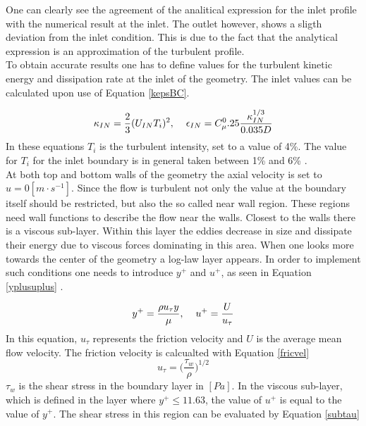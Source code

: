 \documentclass{CFD2017}
\begin{document}

One can clearly see the agreement of the analitical expression for the inlet profile with the numerical result at the inlet. The outlet however, shows a sligth deviation from the inlet condition. This is due to the fact that the analytical expression is an approximation of the turbulent profile.\\
To obtain accurate results one has to define values for the turbulent kinetic energy and dissipation rate at the inlet of the geometry. The inlet values can be calculated upon use of Equation \ref{kepsBC}.

\begin{equation}
\label{kepsBC}
\kappa_{IN}=\frac{2}{3}(U_{IN}T_i)^2,\hspace{4mm}\epsilon_{IN}=C_{\mu}^0.25\frac{\kappa_{IN}^{1/3}}{0.035 D}
\end{equation}
In these equations $T_i$ is the turbulent intensity, set to a value of 4\%. The value for $T_i$ for the inlet boundary is in general taken between 1\% and 6\% \cite{Versteeg2007}.\\
At both top and bottom walls of the geometry the axial velocity is set to $u=0[m\cdot s^{-1}]$. Since the flow is turbulent not only the value at the boundary itself should be restricted, but also the so called near wall region. These regions need wall functions to describe the flow near the walls. Closest to the walls there is a viscous sub-layer. Within this layer the eddies decrease in size and dissipate their energy due to viscous forces dominating in this area. When one looks more towards the center of the geometry a log-law layer appears. In order to implement such conditions one needs to introduce $y^+$ and $u^+$, as seen in Equation \ref{yplusuplus} \cite{Versteeg2007}.

\begin{equation}
\label{yplusuplus}
y^+=\frac{\rho u_{\tau}y}{\mu},\hspace{4mm}u^+=\frac{U}{ u_{\tau}}
\end{equation}
In this equation, $ u_{\tau}$ represents the friction velocity and $U$ is the average mean flow velocity. The friction velocity is calcualted with Equation \ref{fricvel}
\begin{equation}
\label{fricvel}
u_{\tau}=\big(\frac{\tau_w}{\rho}\big)^{1/2}
\end{equation}
$\tau_w$ is the shear stress in the boundary layer in $[Pa]$. In the viscous sub-layer, which is defined in the layer where $y^+\leq 11.63$, the value of $u^+$ is equal to the value of $y^+$. The shear stress in this region can be evaluated by Equation \ref{subtau}
\end{document}
